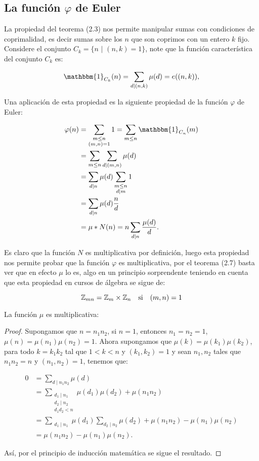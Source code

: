 \subsection{La función \texorpdfstring{$\varphi$}{Lg} de Euler}

La propiedad del teorema (2.3) nos permite manipular sumas  con condiciones de coprimalidad, es decir sumas sobre los $n$ que son coprimos con un entero $k$ fijo. Considere el conjunto $C_k=\{n \text{ | } (n,k)=1\}$, note que la función característica del conjunto $C_k$ es:

$$
\mathbbm{1}_{C_k}(n)=\sum_{d \mid(n, k)} \mu(d)=e((n,k)),
$$

Una aplicación de esta propiedad es la siguiente propiedad de la función $\varphi$ de Euler:

$$\begin{aligned}
\varphi(n) & =\sum_{\substack{m \leq n \\
(m, n)=1}} 1=\sum_{m\leq n}\mathbbm{1}_{C_n}(m) \\
& =\sum_{m \leq n} \sum_{d \mid(m, n)} \mu(d) \\
& =\sum_{d \mid n} \mu(d) \sum_{\substack{m \leq n \\
d \mid m}} 1 \\
& =\sum_{d \mid n} \mu(d) \frac{n}{d}\\
&=\mu*N(n)=n \sum_{d \mid n} \frac{\mu(d)}{d} .
\end{aligned}$$

Es claro que la función $N$ es multiplicativa por definición, luego esta propiedad nos permite probar que la función $\varphi$ es multiplicativa, por el teorema (2.7) basta ver que en efecto $\mu$ lo es, algo en un principio sorprendente teniendo en cuenta que esta propiedad en cursos de álgebra se sigue de:

$$\mathbb{Z}_{mn}=\mathbb{Z}_m\times \mathbb{Z}_n \quad\text{si}\quad(m,n)=1$$

\begin{theorem}
La función $\mu$ es multiplicativa:
\end{theorem}

\begin{proof}

Supongamos que $n=n_1n_2$, si $n=1$, entonces $n_1=n_2=1$, $\mu(n)=\mu(n_1)\mu(n_2)=1$. Ahora supongamos que $\mu(k)=\mu(k_1)\mu(k_2)$, para todo $k=k_1k_2$ tal que $1<k<n$ y $(k_1,k_2)=1$ y sean $n_1,n_2$ tales que $n_1n_2=n$ y $(n_1,n_2)=1$, tenemos que:

\begin{align*}
    0&=\sum_{d\mid n_1n_2}\mu(d)\\
    &=\sum_{\substack{d_1\mid n_1\\ d_2\mid n_2\\d_1d_2<n}}\mu(d_1)\mu(d_2)+\mu(n_1n_2)\\
    &=\sum_{\substack{d_1\mid n_1}}\mu(d_1)\sum_{d_2\mid n_2}\mu(d_2)+\mu(n_1n_2)-\mu(n_1)\mu(n_2)\\
    &=\mu(n_1n_2)-\mu(n_1)\mu(n_2)
.\end{align*}

Así, por el principio de inducción matemática se sigue el resultado.
\end{proof}

